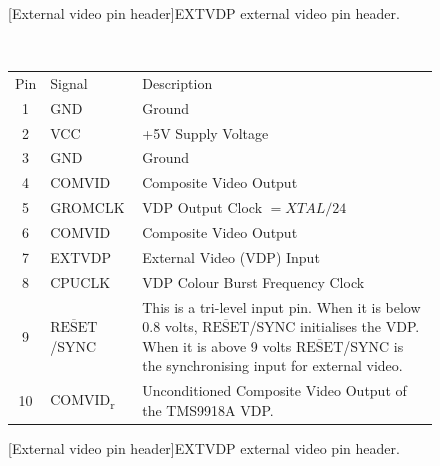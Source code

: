 \documentclass[a4paper,11pt,twoside,openright]{report}
\renewcommand{\arraystretch}{1.1}
\begin{document}
\begin{figure}[h!]
	\centering
    \begin{minipage}[b]{\linewidth}
	    \centering
		[External video pin header]{\textsf{EXTVDP} external video pin header.}
		\label{fig:pinheader}
	\end{minipage}
	~\par\bigskip
    \begin{minipage}[b]{\linewidth}
			\renewcommand{\arraystretch}{1.1}
			\centering
			\begin{tabular}{@{\extracolsep{4pt}}clp{80mm}@{}}
				\hline
				Pin & Signal & Description \\
				\cline{1-3}
				1 & GND & Ground  \\
				2 & VCC & +5V Supply Voltage \\
				3 & GND & Ground  \\
				4 & COMVID & Composite Video Output \\
				5 & GROMCLK & VDP Output Clock $= XTAL/24$ \\
				6 & COMVID & Composite Video Output \\
				7 & EXTVDP & External Video (VDP) Input \\
				8 & CPUCLK &  VDP Colour Burst Frequency Clock \\
				9 &  $\overline{\mbox{RESET}}$/SYNC & This is a tri-level input pin. When it is below 0.8 volts, $\overline{\mbox{RESET}}$/SYNC initialises the VDP. When it is above 9 volts $\overline{\mbox{RESET}}$/SYNC is the synchronising input for external video. \\
				10 & COMVID\textsubscript{r} & Unconditioned Composite Video Output of the TMS9918A VDP. \\
				\hline
			\end{tabular}

		[External video pin header]{\textsf{EXTVDP} external video pin header.}
		\label{tab:ttlpins}
	\end{minipage}
\end{figure}
\end{document}
